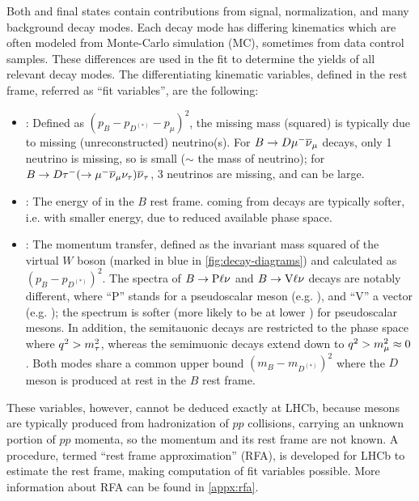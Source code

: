 Both \Dstarp\mun and \Dz\mun final states contain contributions from signal,
normalization, and many background decay modes.
Each decay mode has differing kinematics
which are often modeled from Monte-Carlo simulation (MC),
sometimes from data control samples.
These differences are used in the fit to determine the yields of all
relevant decay modes.
The differentiating kinematic variables, defined in the \B rest frame,
referred as ``fit variables'',
are the following:
\begin{itemize}
    \item \mmSq: Defined as $(p_B - p_{D^{(*)}} - p_\mu)^2$,
        the missing mass (squared) is typically due to missing (unreconstructed)
        neutrino(s).
        For $B \rightarrow D {\mu^-} {{\overline{\nu}}_\mu}$ decays, only 1 neutrino is missing,
        so \mmSq is small ($\sim$ the mass of neutrino);
        for $B \rightarrow D {\tau^-} (\rightarrow {\ensuremath{\mu^-}}{\ensuremath{{\overline{\nu}}_\mu}}{\ensuremath{{\nu}_\tau}}) {{\overline{\nu}}_\tau}$,
        3 neutrinos are missing, and \mmSq can be large.
    \item \el: The energy of \mun in the $B$ rest frame.
        \mun coming from \taum decays are typically
        softer, i.e. with smaller energy, due to reduced available phase space.
    \item \qSq: The momentum transfer, defined as the invariant mass squared
        of the virtual $W$ boson (marked in blue in \cref{fig:decay-diagrams})
        and calculated as $(p_B - p_{D^{(*)}})^2$.
        The \qSq spectra of
        $B \rightarrow \text{P} \ell{\ensuremath{\nu}}$ and $B \rightarrow \text{V} \ell{\ensuremath{\nu}}$
        decays are notably different,
        where ``P'' stands for a pseudoscalar meson (e.g. \Dz),
        and ``V'' a vector (e.g. \Dstar);
        the \qSq spectrum is softer
        (more likely to be at lower \qSq) for pseudoscalar mesons.
        In addition, the semitauonic decays are restricted to the phase space
        where $q^2 > m^2_\tau$,
        whereas the semimuonic decays extend down to $q^2 > m^2_\mu \approx 0$.
        Both modes share a common \qSq upper bound $(m_B - m_{D^{(*)}})^2$
        where the $D$ meson is produced at rest in the $B$ rest frame.
\end{itemize}
These variables, however, cannot be deduced exactly at LHCb,
because \B mesons
are typically produced from hadronization of $pp$ collisions,
carrying an unknown portion of $pp$ momenta,
so the \B momentum and its rest frame are not known.
A procedure, termed ``rest frame approximation'' (RFA), is developed for LHCb
to estimate the \B rest frame, making computation of fit variables possible.
More information about RFA can be found in \cref{appx:rfa}.

